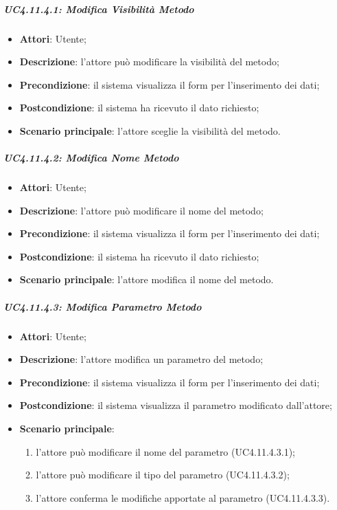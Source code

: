 \subparagraph{UC4.11.4.1: Modifica Visibilità Metodo}
\label{UC4.11.4.1}
\begin{itemize}
\item \textbf{Attori}: Utente;
\item \textbf{Descrizione}: l'attore può modificare la visibilità del metodo;	
\item \textbf{Precondizione}: il sistema visualizza il form per l'inserimento dei dati;	
\item \textbf{Postcondizione}: il sistema ha ricevuto il dato richiesto;	
\item \textbf{Scenario principale}:
l'attore sceglie la visibilità del metodo.
\end{itemize}

\subparagraph{UC4.11.4.2: Modifica Nome Metodo}
\label{UC4.11.4.2}
\begin{itemize}
\item \textbf{Attori}: Utente;
\item \textbf{Descrizione}: l'attore può modificare il nome del metodo;	
\item \textbf{Precondizione}: il sistema visualizza il form per l'inserimento dei dati;	
\item \textbf{Postcondizione}: il sistema ha ricevuto il dato richiesto;	
\item \textbf{Scenario principale}:
l'attore modifica il nome del metodo.	
\end{itemize}

\subparagraph{UC4.11.4.3: Modifica Parametro Metodo}
\label{UC4.11.4.3}
\begin{itemize}
\item \textbf{Attori}: Utente;
\item \textbf{Descrizione}: l'attore modifica un parametro del metodo;	
\item \textbf{Precondizione}: il sistema visualizza il form per l'inserimento dei dati;	
\item \textbf{Postcondizione}: il sistema visualizza il parametro modificato dall'attore;	
\item \textbf{Scenario principale}:
\begin{enumerate}
\item l'attore può modificare il nome del parametro (UC4.11.4.3.1);
\item l'attore può modificare il tipo del parametro (UC4.11.4.3.2);
\item l'attore conferma le modifiche apportate al parametro (UC4.11.4.3.3).
\end{enumerate}	
\end{itemize}

